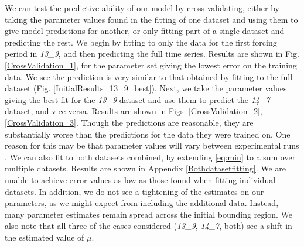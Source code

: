 \documentclass[10pt,journal]{./IEEE_latex_class/IEEEtran}
\begin{document}
 We can test the predictive ability of our model by cross validating, either by taking the parameter values found in the fitting of one dataset and using them to give model predictions for another, or only fitting part of a single dataset and predicting the rest.  We begin by fitting to only the data for the first forcing period in \textit{13\_9}, and then predicting the full time series. Results are shown in Fig. \ref{CrossValidation_1}, for the parameter set giving the lowest error on the training data. We see the prediction is very similar to that obtained by fitting to the full dataset (Fig. \ref{InitialResults_13_9_best}). Next, we take the parameter values giving the best fit for the  \textit{13\_9} dataset and use them to predict the \textit{14\_7} dataset, and vice versa. Results are shown in Figs. \ref{CrossValidation_2}, \ref{CrossValidation_3}.
Though the predictions are reasonable, they are substantially worse than the predictions for the data they were trained on. One reason for this may be that parameter values will vary between experimental runs \cite{Hu2015}. We can also fit to both datasets combined, by extending \eqref{eq:min} to a sum over multiple datasets. Results are shown in Appendix \ref{Bothdatasetfitting}. We are unable to achieve error values as low as those found when fitting individual datasets. In addition, we do not see a tightening of the estimates on our parameters, as we might expect from including the additional data. Instead, many parameter estimates remain spread across the initial bounding region. We also note that all three of the cases considered (\textit{13\_9}, \textit{14\_7}, both) see a shift in the estimated value of $\mu$.
 
\end{document}
